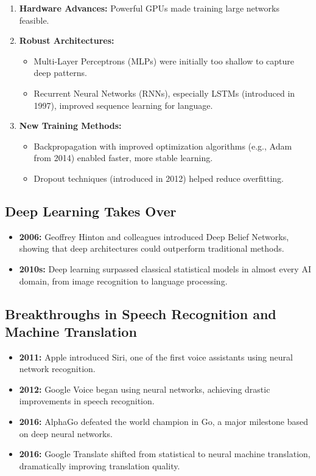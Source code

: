 \begin{enumerate}
  \item \textbf{Hardware Advances:} Powerful GPUs made training large networks feasible.
  \item \textbf{Robust Architectures:}
    \begin{itemize}
      \item Multi-Layer Perceptrons (MLPs) were initially too shallow to capture deep
            patterns.
      \item Recurrent Neural Networks (RNNs), especially LSTMs (introduced in 1997),
            improved sequence learning for language.
    \end{itemize}
  \item \textbf{New Training Methods:}
    \begin{itemize}
      \item Backpropagation with improved optimization algorithms (e.g., Adam from 2014)
            enabled faster, more stable learning.
      \item Dropout techniques (introduced in 2012) helped reduce overfitting.
    \end{itemize}
\end{enumerate}

\subsection{Deep Learning Takes Over}

\begin{itemize}
  \item \textbf{2006:} Geoffrey Hinton and colleagues introduced Deep Belief Networks,
        showing that deep architectures could outperform traditional methods.
  \item \textbf{2010s:} Deep learning surpassed classical statistical models in almost every
        AI domain, from image recognition to language processing.
\end{itemize}

\subsection{Breakthroughs in Speech Recognition and Machine Translation}

\begin{itemize}
  \item \textbf{2011:} Apple introduced Siri, one of the first voice assistants using neural
        network recognition.
  \item \textbf{2012:} Google Voice began using neural networks, achieving drastic improvements
        in speech recognition.
  \item \textbf{2016:} AlphaGo defeated the world champion in Go, a major milestone based on deep
        neural networks.
  \item \textbf{2016:} Google Translate shifted from statistical to neural machine translation,
        dramatically improving translation quality.
\end{itemize}

